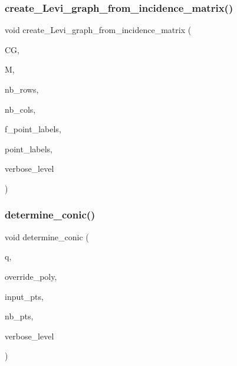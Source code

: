 \subsubsection{\texorpdfstring{create\+\_\+\+Levi\+\_\+graph\+\_\+from\+\_\+incidence\+\_\+matrix()}{create\_Levi\_graph\_from\_incidence\_matrix()}}
{\footnotesize\ttfamily void create\+\_\+\+Levi\+\_\+graph\+\_\+from\+\_\+incidence\+\_\+matrix (\begin{DoxyParamCaption}\item[{\mbox{\hyperlink{classcolored__graph}{colored\+\_\+graph}} $\ast$\&}]{CG,  }\item[{\mbox{\hyperlink{galois_8h_a09fddde158a3a20bd2dcadb609de11dc}{I\+NT}} $\ast$}]{M,  }\item[{\mbox{\hyperlink{galois_8h_a09fddde158a3a20bd2dcadb609de11dc}{I\+NT}}}]{nb\+\_\+rows,  }\item[{\mbox{\hyperlink{galois_8h_a09fddde158a3a20bd2dcadb609de11dc}{I\+NT}}}]{nb\+\_\+cols,  }\item[{\mbox{\hyperlink{galois_8h_a09fddde158a3a20bd2dcadb609de11dc}{I\+NT}}}]{f\+\_\+point\+\_\+labels,  }\item[{\mbox{\hyperlink{galois_8h_a09fddde158a3a20bd2dcadb609de11dc}{I\+NT}} $\ast$}]{point\+\_\+labels,  }\item[{\mbox{\hyperlink{galois_8h_a09fddde158a3a20bd2dcadb609de11dc}{I\+NT}}}]{verbose\+\_\+level }\end{DoxyParamCaption})}

\mbox{\label{galois__global_8_c_a1f36b2be45a6576165929165abb56f1e}} 
\subsubsection{\texorpdfstring{determine\+\_\+conic()}{determine\_conic()}}
{\footnotesize\ttfamily void determine\+\_\+conic (\begin{DoxyParamCaption}\item[{\mbox{\hyperlink{galois_8h_a09fddde158a3a20bd2dcadb609de11dc}{I\+NT}}}]{q,  }\item[{const \mbox{\hyperlink{galois_8h_ab6cc7b4aeb6ea31aba2b3fbfc83ff5e6}{B\+Y\+TE}} $\ast$}]{override\+\_\+poly,  }\item[{\mbox{\hyperlink{galois_8h_a09fddde158a3a20bd2dcadb609de11dc}{I\+NT}} $\ast$}]{input\+\_\+pts,  }\item[{\mbox{\hyperlink{galois_8h_a09fddde158a3a20bd2dcadb609de11dc}{I\+NT}}}]{nb\+\_\+pts,  }\item[{\mbox{\hyperlink{galois_8h_a09fddde158a3a20bd2dcadb609de11dc}{I\+NT}}}]{verbose\+\_\+level }\end{DoxyParamCaption})}

